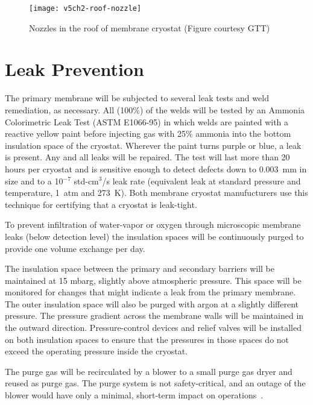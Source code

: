 \begin{figure}[htbp]
\centering
\texttt{[image: v5ch2-roof-nozzle]} 
\caption[Nozzles in the roof of membrane cryostat]{Nozzles in the roof of membrane cryostat (Figure courtesy GTT)}
\label{fig:v5ch2-roof-nozzle}
\end{figure}


\chapter{Leak Prevention}
\label{sec:cryo-cryosys-leak}

The primary membrane will be subjected to several leak tests 
and weld remediation, as necessary. All (100\%) of the welds 
will be tested by an Ammonia Colorimetric Leak Test (ASTM E1066-95) 
in which welds are painted with a reactive yellow paint before 
injecting gas with 25\% ammonia into the bottom insulation space 
of the cryostat.  Wherever the paint turns purple or blue, a leak 
is present. Any and all leaks will be repaired. The test will last 
more than 20 hours per cryostat and is sensitive enough to 
detect defects down to 0.003~mm in size and to a 10$^{-7}$ 
std-cm$^3$/s leak rate (equivalent leak at standard pressure 
and temperature, 1~atm and 273~K). Both membrane cryostat 
manufucturers use this technique for certifying that 
a cryostat is leak-tight.


To prevent infiltration of water-vapor or oxygen through 
microscopic membrane leaks (below detection level) the 
insulation spaces will be continuously purged to provide 
one volume exchange per day.  

The insulation space between the primary and 
secondary barriers will be maintained at 15 mbarg,  
slightly above atmospheric pressure. This space will
be monitored for changes that might indicate a leak 
from the primary membrane.  The outer insulation space 
will also be purged with argon at a slightly different 
pressure. The pressure gradient across the membrane walls 
will be maintained in the outward direction. Pressure-control 
devices and relief valves will be installed on both insulation 
spaces to ensure that the pressures in those spaces do not 
exceed the operating pressure inside the cryostat. 

The purge gas will be recirculated by a blower to a small 
purge gas dryer and reused as purge gas. The purge system 
is not safety-critical, and an outage of the blower would 
have only a minimal, short-term impact on operations~\cite{docdb4303}.

